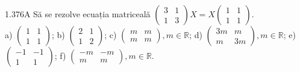 \documentclass[11pt]{article}
\begin{document}
1.376A Să se rezolve ecuația matriceală $\left(\begin{array}{ll}3 & 1 \\ 1 & 3\end{array}\right) X=X\left(\begin{array}{ll}1 & 1 \\ 1 & 1\end{array}\right)$.\\ a) $\left(\begin{array}{ll}1 & 1 \\ 1 & 1\end{array}\right)$; b) $\left(\begin{array}{ll}2 & 1 \\ 1 & 2\end{array}\right)$; c) $\left(\begin{array}{ll}m & m \\ m & m\end{array}\right), m \in \mathbb{R}$; d) $\left(\begin{array}{cc}3 m & m \\ m & 3 m\end{array}\right), m \in \mathbb{R}$; e) $\left(\begin{array}{cc}-1 & -1 \\ 1 & 1\end{array}\right)$; f) $\left(\begin{array}{cc}-m & -m \\ m & m\end{array}\right), m \in \mathbb{R}$.
\end{document}
